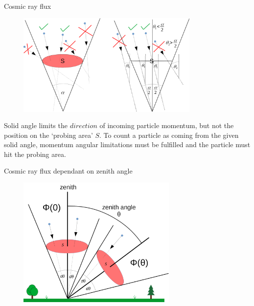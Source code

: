 \documentclass{beamer}
\begin{document}
\begin{frame}{Cosmic ray flux}

\begin{figure}
\includegraphics[width=0.8\textwidth]{images/steradianDef.png}~
\end{figure}
Solid angle limits the $direction$ of incoming particle momentum, but not the position on the `probing area' $S$. To count a particle as coming from the given solid angle, momentum angular limitations must be fulfilled and the particle must hit the probing area.
\end{frame}

\begin{frame}{Cosmic ray flux dependant on zenith angle}
\begin{figure}
\includegraphics[width=0.7\textwidth]{images/fluxZenithAngleDef.png}%
\end{figure}
\end{frame}
\end{document}

